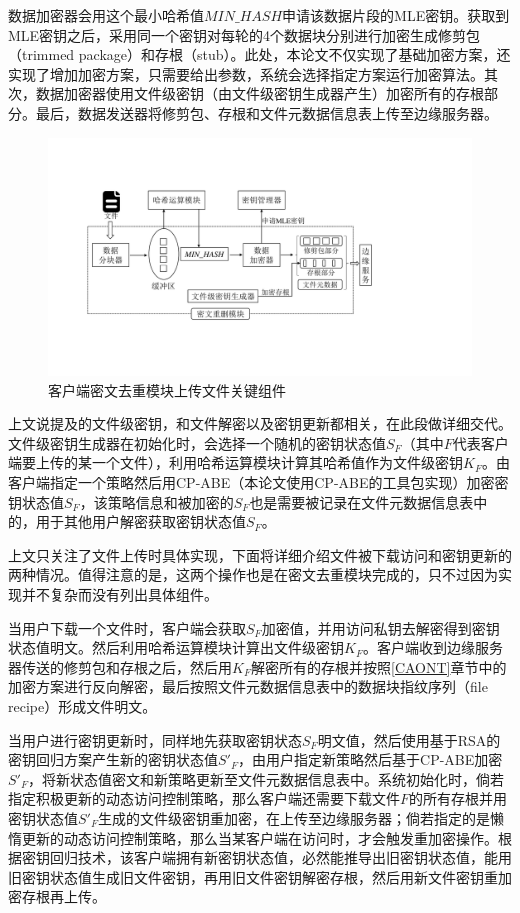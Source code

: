 \documentclass[promaster]{thesis-uestc}
\begin{document}
数据加密器会用这个最小哈希值$MIN\_HASH$申请该数据片段的MLE密钥。获取到MLE密钥之后，采用同一个密钥对每轮的4个数据块分别进行加密生成修剪包（trimmed package）和存根（stub）。此处，本论文不仅实现了基础加密方案，还实现了增加加密方案，只需要给出参数，系统会选择指定方案运行加密算法。其次，数据加密器使用文件级密钥（由文件级密钥生成器产生）加密所有的存根部分。最后，数据发送器将修剪包、存根和文件元数据信息表上传至边缘服务器。
\begin{figure}[htbp]
    \centering
    \includegraphics[width = 1.0\linewidth]{pic/密文重删模块.pdf}
    \caption{客户端密文去重模块上传文件关键组件}
    \label{密文去重模块上传文件关键组件}
\end{figure}

上文说提及的文件级密钥，和文件解密以及密钥更新都相关，在此段做详细交代。文件级密钥生成器在初始化时，会选择一个随机的密钥状态值$S_F$（其中$F$代表客户端要上传的某一个文件），利用哈希运算模块计算其哈希值作为文件级密钥$K_F$。由客户端指定一个策略然后用CP-ABE（本论文使用CP-ABE的工具包实现）加密密钥状态值$S_F$，该策略信息和被加密的$S_F$也是需要被记录在文件元数据信息表中的，用于其他用户解密获取密钥状态值$S_F$。

上文只关注了文件上传时具体实现，下面将详细介绍文件被下载访问和密钥更新的两种情况。值得注意的是，这两个操作也是在密文去重模块完成的，只不过因为实现并不复杂而没有列出具体组件。

当用户下载一个文件时，客户端会获取$S_F$加密值，并用访问私钥去解密得到密钥状态值明文。然后利用哈希运算模块计算出文件级密钥$K_F$。客户端收到边缘服务器传送的修剪包和存根之后，然后用$K_F$解密所有的存根并按照\ref{CAONT}章节中的加密方案进行反向解密，最后按照文件元数据信息表中的数据块指纹序列（file recipe）形成文件明文。

当用户进行密钥更新时，同样地先获取密钥状态$S_F$明文值，然后使用基于RSA的密钥回归方案产生新的密钥状态值$S'_F$，由用户指定新策略然后基于CP-ABE加密$S'_F$，将新状态值密文和新策略更新至文件元数据信息表中。系统初始化时，倘若指定积极更新的动态访问控制策略，那么客户端还需要下载文件$F$的所有存根并用密钥状态值$S'_F$生成的文件级密钥重加密，在上传至边缘服务器；倘若指定的是懒惰更新的动态访问控制策略，那么当某客户端在访问时，才会触发重加密操作。根据密钥回归技术，该客户端拥有新密钥状态值，必然能推导出旧密钥状态值，能用旧密钥状态值生成旧文件密钥，再用旧文件密钥解密存根，然后用新文件密钥重加密存根再上传。
\end{document}

